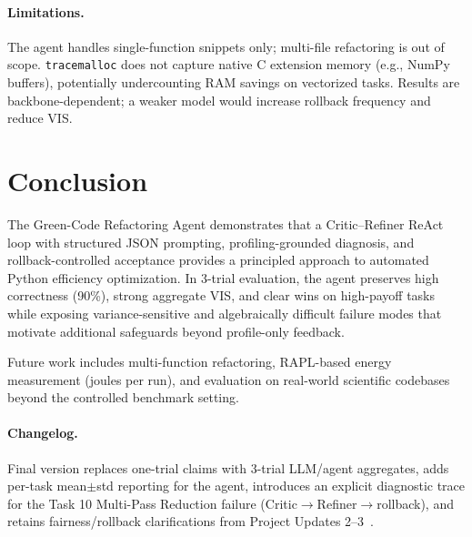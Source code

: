 \documentclass{article}
\begin{document}
\paragraph{Limitations.}
The agent handles single-function snippets only; multi-file refactoring is out of scope. \texttt{tracemalloc} does not capture native C extension memory (e.g., NumPy buffers), potentially undercounting RAM savings on vectorized tasks. Results are backbone-dependent; a weaker model would increase rollback frequency and reduce VIS.

\section{Conclusion}

The Green-Code Refactoring Agent demonstrates that a Critic--Refiner ReAct loop with structured JSON prompting, profiling-grounded diagnosis, and rollback-controlled acceptance provides a principled approach to automated Python efficiency optimization. In 3-trial evaluation, the agent preserves high correctness (90\%), strong aggregate VIS, and clear wins on high-payoff tasks while exposing variance-sensitive and algebraically difficult failure modes that motivate additional safeguards beyond profile-only feedback.

Future work includes multi-function refactoring, RAPL-based energy measurement (joules per run), and evaluation on real-world scientific codebases beyond the controlled benchmark setting.

\paragraph{Changelog.}
Final version replaces one-trial claims with 3-trial LLM/agent aggregates, adds per-task mean$\pm$std reporting for the agent, introduces an explicit diagnostic trace for the Task 10 Multi-Pass Reduction failure (Critic$\rightarrow$Refiner$\rightarrow$rollback), and retains fairness/rollback clarifications from Project Updates 2--3~\cite{update2,update3}.
\end{document}
